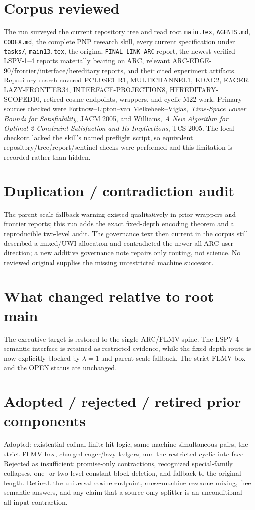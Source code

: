 \documentclass[11pt]{article}
\begin{document}
\section*{Corpus reviewed}
The run surveyed the current repository tree and read root \texttt{main.tex},
\texttt{AGENTS.md}, \texttt{CODEX.md}, the complete PNP research skill, every
current specification under \texttt{tasks/}, \texttt{main13.tex}, the original
\texttt{FINAL-LINK-ARC} report, the newest verified LSPV-1--4 reports materially
bearing on ARC, relevant ARC-EDGE-90/frontier/interface/hereditary reports, and
their cited experiment artifacts.  Repository search covered PCLOSE1-R1,
MULTICHANNEL1, KDAG2, EAGER-LAZY-FRONTIER34,
INTERFACE-PROJECTION8, HEREDITARY-SCOPED10, retired cosine endpoints, wrappers,
and cyclic M22 work.  Primary sources checked were Fortnow--Lipton--van
Melkebeek--Viglas, \emph{Time-Space Lower Bounds for Satisfiability}, JACM 2005,
and Williams, \emph{A New Algorithm for Optimal 2-Constraint Satisfaction and
Its Implications}, TCS 2005.  The local checkout lacked the skill's named
preflight script, so equivalent repository/tree/report/sentinel checks were
performed and this limitation is recorded rather than hidden.

\section*{Duplication / contradiction audit}
The parent-scale-fallback warning existed qualitatively in prior wrappers and
frontier reports; this run adds the exact fixed-depth encoding theorem and a
reproducible two-level audit.  The governance text then current in the corpus
still described a mixed/UWI allocation and contradicted the newer all-ARC user
direction; a new additive governance note repairs only routing, not science.
No reviewed original supplies the missing unrestricted machine successor.

\section*{What changed relative to root main}
The executive target is restored to the single ARC/FLMV spine.  The LSPV-4
semantic interface is retained as restricted evidence, while the fixed-depth
route is now explicitly blocked by $\lambda=1$ and parent-scale fallback.  The
strict FLMV box and the OPEN status are unchanged.

\section*{Adopted / rejected / retired prior components}
Adopted: existential cofinal finite-hit logic, same-machine simultaneous pairs,
the strict FLMV box, charged eager/lazy ledgers, and the restricted cyclic
interface.  Rejected as insufficient: promise-only contractions, recognized
special-family collapses, one- or two-level constant block deletion, and
fallback to the original length.  Retired: the universal cosine endpoint,
cross-machine resource mixing, free semantic answers, and any claim that a
source-only splitter is an unconditional all-input contraction.
\end{document}
